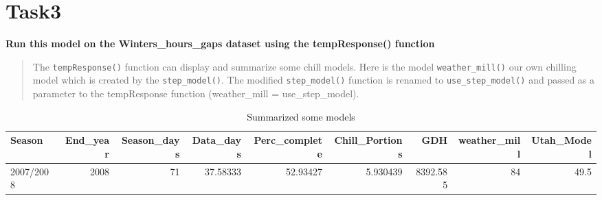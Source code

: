 \documentclass[
]{book}
\newenvironment{Shaded}{\begin{snugshade}}{\end{snugshade}}
\newcommand{\CommentTok}[1]{\textcolor[rgb]{0.56,0.35,0.01}{\textit{#1}}}
\newcommand{\DataTypeTok}[1]{\textcolor[rgb]{0.13,0.29,0.53}{#1}}
\newcommand{\DecValTok}[1]{\textcolor[rgb]{0.00,0.00,0.81}{#1}}
\newcommand{\KeywordTok}[1]{\textcolor[rgb]{0.13,0.29,0.53}{\textbf{#1}}}
\newcommand{\NormalTok}[1]{#1}
\newcommand{\OperatorTok}[1]{\textcolor[rgb]{0.81,0.36,0.00}{\textbf{#1}}}
\newcommand{\StringTok}[1]{\textcolor[rgb]{0.31,0.60,0.02}{#1}}
\begin{document}
\hypertarget{task3}{%
\section{Task3}\label{task3}}

\textbf{Run this model on the Winters\_hours\_gaps dataset using the tempResponse() function}

\begin{quote}
The \texttt{tempResponse()} function can display and summarize some chill models. Here is the model \texttt{weather\_mill()} our own chilling model which is created by the \texttt{step\_model()}. The modified \texttt{step\_model()} function is renamed to \texttt{use\_step\_model()} and passed as a parameter to the tempResponse function (weather\_mill = use\_step\_model).
\end{quote}

\begin{Shaded}
\end{Shaded}

\begin{table}

\caption{\label{tab:unnamed-chunk-13}Summarized some models}
\fontsize{10}{12}\selectfont
\begin{tabular}[t]{l|r|r|r|r|r|r|r|r}
\hline
Season & End\_year & Season\_days & Data\_days & Perc\_complete & Chill\_Portions & GDH & weather\_mill & Utah\_Model\\
\hline
2007/2008 & 2008 & 71 & 37.58333 & 52.93427 & 5.930439 & 8392.585 & 84 & 49.5\\
\hline
\end{tabular}
\end{table}
\end{document}
